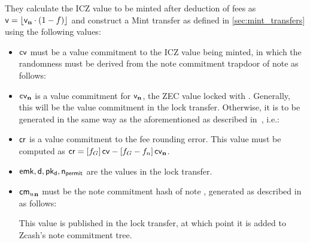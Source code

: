 They calculate the ICZ value to be minted after deduction of fees as $\val = \left \lfloor{\valn \cdot (1 - f)}\right \rfloor$ and construct a Mint transfer as defined in \cref{sec:mint_transfers} using the following values:
\begin{itemize}
    \item $\mathsf{cv}$ must be a value commitment to the ICZ value being minted, in which the randomness must be derived from the note commitment trapdoor of note \n as follows:
    
    \item $\mathsf{cv_{\mathbf{n}}}$ is a value commitment for $\mathsf{v_{\mathbf{n}}}$, the ZEC value locked with \vault.
    Generally, this will be the value commitment \cv in the lock transfer.
    Otherwise, it is to be generated in the same way as the aforementioned as described in~\cite[Section 4.6.2]{hopwood2016zcash}, i.e.:

    \item $\mathsf{cr}$ is a value commitment to the fee rounding error.
    This value must be computed as $\mathsf{cr} = [f_G]\,\mathsf{cv} - [f_G - f_n]\,\mathsf{cv_{\mathbf{n}}}$.
    
    \item $\mathsf{emk}, \mathsf{d}, \mathsf{pk_d}, \mathsf{n_{permit}}$ are the values in the lock transfer.
    
    \item $\mathsf{{cm_{\mathnormal{u}}}_{\mathbf{n}}}$ must be the note commitment hash of note \n, generated as described in~\cite[Section 4.6.2]{hopwood2016zcash} as follows:
    This value is published in the lock transfer, at which point it is added to Zcash's note commitment tree.
    

\end{itemize}
